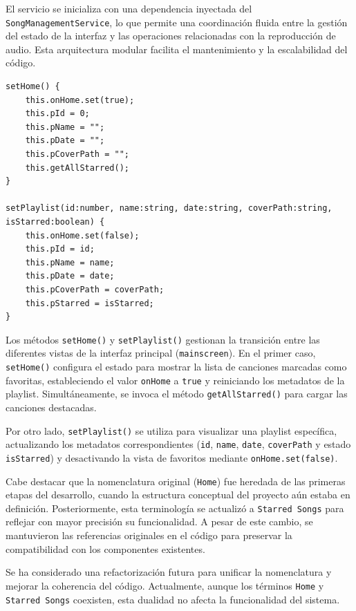 \documentclass[11pt, a4paper]{article}
\begin{document}
                El servicio se inicializa con una dependencia inyectada del \\ \verb|SongManagementService|, lo que permite una coordinación fluida entre la gestión del estado de la interfaz y las operaciones relacionadas con la reproducción de audio. Esta arquitectura modular facilita el mantenimiento y la escalabilidad del código. \\


                \begin{lstlisting}[caption={setHome() y setPlaylist()}]
setHome() {
    this.onHome.set(true);
    this.pId = 0;
    this.pName = "";
    this.pDate = "";
    this.pCoverPath = "";
    this.getAllStarred();
}

setPlaylist(id:number, name:string, date:string, coverPath:string, isStarred:boolean) {
    this.onHome.set(false);
    this.pId = id;
    this.pName = name;
    this.pDate = date;
    this.pCoverPath = coverPath;
    this.pStarred = isStarred;
}
                \end{lstlisting}

                Los métodos \verb|setHome()| y \verb|setPlaylist()| gestionan la transición entre las diferentes vistas de la interfaz principal (\verb|mainscreen|). En el primer caso, \verb|setHome()| configura el estado para mostrar la lista de canciones marcadas como favoritas, estableciendo el valor \verb|onHome| a \verb|true| y reiniciando los metadatos de la playlist. Simultáneamente, se invoca el método \verb|getAllStarred()| para cargar las canciones destacadas.

                Por otro lado, \verb|setPlaylist()| se utiliza para visualizar una playlist específica, actualizando los metadatos correspondientes (\verb|id|, \verb|name|, \verb|date|, \verb|coverPath| y estado \verb|isStarred|) y desactivando la vista de favoritos mediante \verb|onHome.set(false)|.

                Cabe destacar que la nomenclatura original (\verb|Home|) fue heredada de las primeras etapas del desarrollo, cuando la estructura conceptual del proyecto aún estaba en definición. Posteriormente, esta terminología se actualizó a \verb|Starred Songs| para reflejar con mayor precisión su funcionalidad. A pesar de este cambio, se mantuvieron las referencias originales en el código para preservar la compatibilidad con los componentes existentes.

                Se ha considerado una refactorización futura para unificar la nomenclatura y mejorar la coherencia del código. Actualmente, aunque los términos \verb|Home| y \verb|Starred Songs| coexisten, esta dualidad no afecta la funcionalidad del sistema. \\
\end{document}
